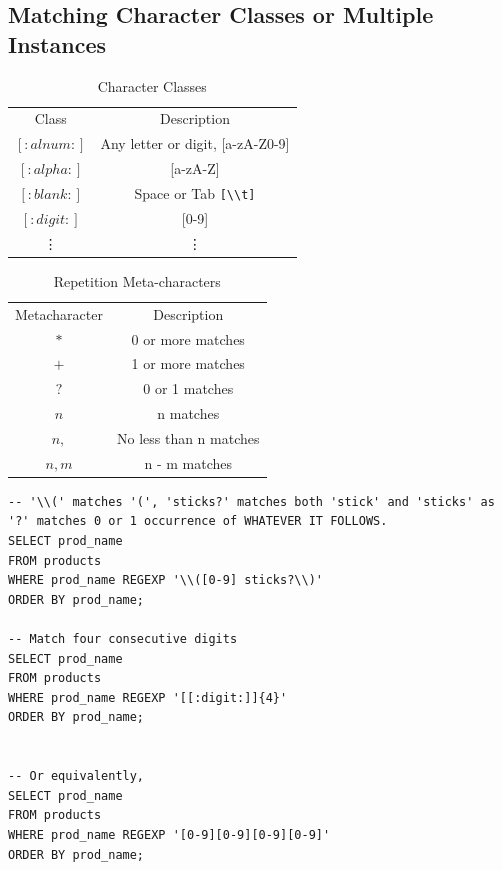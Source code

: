 \documentclass[12pt,oneside,a4paper]{article}
\begin{document}
\subsection{Matching Character Classes or Multiple Instances}

\begin{table}[h]
	\centering
	\begin{tabular}{ |c|c|} 
		\hline
		Class & Description\\ 
		$[:alnum:]$ & Any letter or digit, [a-zA-Z0-9] \\ 
		$[:alpha:]$ & [a-zA-Z] \\ 
		$[:blank:]$ & Space or Tab \verb|[\\t]| \\ 
		$[:digit:]$ & [0-9] \\ 
		\vdots & \vdots\\
		\hline
	\end{tabular}
	\caption{Character Classes}
\end{table}
\FloatBarrier


\begin{table}[h]
	\centering
	\begin{tabular}{ |c|c|} 
		\hline
		Metacharacter & Description\\ 
		$*$ & 0 or more matches \\ 
		$+$ & 1 or more  matches\\ 
		$?$ & 0 or 1 matches \\ 
		${n}$ & n matches \\ 
		${n, }$ & No less than n matches \\ 
		${n, m}$ & n - m matches \\ 
		\hline
	\end{tabular}
	\caption{Repetition Meta-characters}
\end{table}

\begin{lstlisting}
-- '\\(' matches '(', 'sticks?' matches both 'stick' and 'sticks' as '?' matches 0 or 1 occurrence of WHATEVER IT FOLLOWS.
SELECT prod_name 
FROM products 
WHERE prod_name REGEXP '\\([0-9] sticks?\\)'
ORDER BY prod_name;

-- Match four consecutive digits 
SELECT prod_name 
FROM products 
WHERE prod_name REGEXP '[[:digit:]]{4}'
ORDER BY prod_name;


-- Or equivalently,
SELECT prod_name 
FROM products 
WHERE prod_name REGEXP '[0-9][0-9][0-9][0-9]'
ORDER BY prod_name;
\end{lstlisting}
\end{document}
